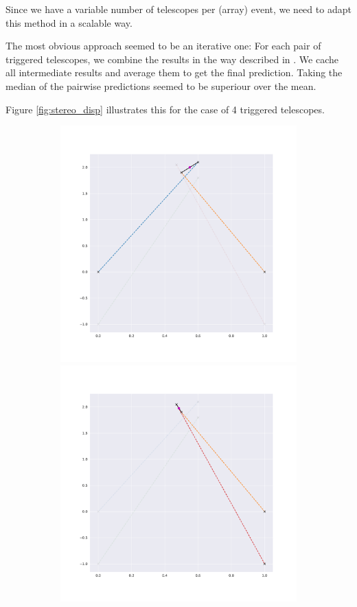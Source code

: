 Since we have a variable number of telescopes per (array) event,
we need to adapt this method in a scalable way.

The most obvious approach seemed to be an iterative one:
For each pair of triggered telescopes, we combine the results 
in the way described in \cite{disp magic paper}.
We cache all intermediate results and average them to get the final prediction.
Taking the median of the pairwise predictions seemed to be superiour
over the mean.

Figure \ref{fig:stereo_disp} illustrates this for the case of 4 triggered telescopes.


\begin{figure}
    \centering
    \begin{subfigure}{0.23\textwidth}
        \includegraphics[width=0.9\linewidth]{Plots/stereo_magic_1.pdf} 
        \includegraphics[width=0.9\linewidth]{Plots/stereo_magic_5.pdf} 

\end{subfigure}
\end{figure}
